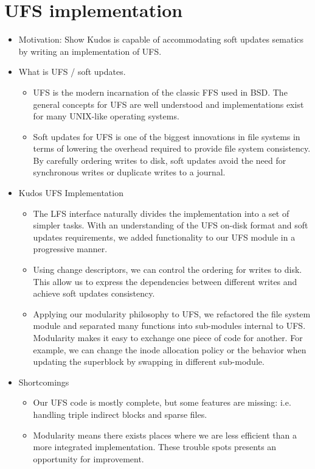 \section{UFS implementation}
\begin{itemize}
\item Motivation: Show Kudos is capable of accommodating soft updates
  sematics by writing an implementation of UFS.
\item What is UFS / soft updates.
  \begin{itemize}
  \item UFS is the modern incarnation of the classic FFS used in BSD.
    The general concepts for UFS are well understood and implementations
    exist for many UNIX-like operating systems.
  \item Soft updates for UFS is one of the biggest innovations in file
    systems in terms of lowering the overhead required to provide file
    system consistency. By carefully ordering writes to disk, soft updates
    avoid the need for synchronous writes or duplicate writes to a journal.
  \end{itemize}
\item Kudos UFS Implementation
  \begin{itemize}
  \item The LFS interface naturally divides the implementation into a set
    of simpler tasks. With an understanding of the UFS on-disk format and
    soft updates requirements, we added functionality to our UFS module
    in a progressive manner.
  \item Using change descriptors, we can control the ordering for writes
    to disk. This allow us to express the dependencies between different
    writes and achieve soft updates consistency.
  \item Applying our modularity philosophy to UFS, we refactored the file
    system module and separated many functions into sub-modules internal
    to UFS. Modularity makes it easy to exchange one piece of code for
    another. For example, we can change the inode allocation policy or
    the behavior when updating the superblock by swapping in different
    sub-module.
  \end{itemize}
\item Shortcomings
  \begin{itemize}
  \item Our UFS code is mostly complete, but some features are missing:
    i.e. handling triple indirect blocks and sparse files.
  \item Modularity means there exists places where we are less efficient
    than a more integrated implementation. These trouble spots presents
    an opportunity for improvement.
  \end{itemize}
\end{itemize}
